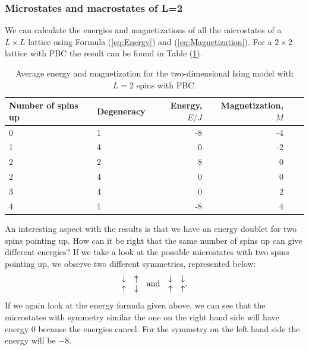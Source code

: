 \documentclass[norsk,a4paper,12pt]{article}
\begin{document}
\subsubsection{Microstates and macrostates of L=2}
We can calculate the energies and magnetizations of all the microstates of a $L\times L$ lattice using Formula (\ref{eq:Energy}) and (\ref{eq:Magnetization}). For a $2\times2$ lattice with PBC the result can be found in Table (\ref{tab:analytical}).  
\begin{table}[H]
\centering
\caption{Average energy and magnetization for the two-dimensional Ising model with $L=2$ spins with PBC.}
\label{tab:analytical} 
\begin{tabularx}{\textwidth}{XlrrrX}
\toprule
Number of spins up & Degeneracy & Energy, $E/J$  & Magnetization, $M$ \\
\midrule
0   & 1  & -8 & -4    \\
1	& 4  & 0  & -2    \\
2   & 2  & 8  & 0     \\
2   & 4  & 0  & 0     \\
3   & 4  & 0  & 2     \\
4   & 1  & -8 & 4     \\
\bottomrule
\end{tabularx}
\end{table}
An interesting aspect with the results is that we have an energy doublet for two spins pointing up. How can it be right that the same number of spins up can give different energies? If we take a look at the possible microstates with two spins pointing up, we observe two different symmetries, represented below:
\begin{equation}
\mqty{\downarrow&\uparrow\\ \uparrow&\downarrow}\quad\text{and}\quad
\mqty{\downarrow&\downarrow\\ \uparrow&\uparrow}.
\end{equation}
If we again look at the energy formula given above, we can see that the microstates with symmetry similar the one on the right hand side will have energy $0$ because the energies cancel. For the symmetry on the left hand side the energy will be $-8$.
\end{document}
